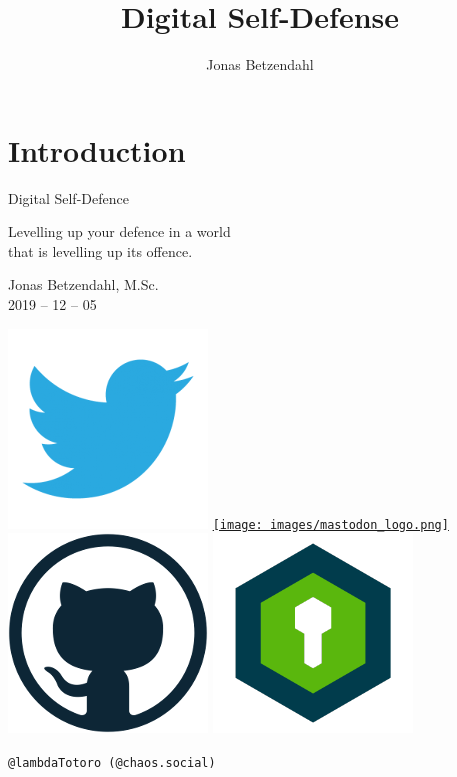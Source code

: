 \documentclass[aspectratio=169,x11names]{beamer}
\author{Jonas Betzendahl}
\title{Digital Self-Defense}
\begin{document}
\section{Introduction}

\begin{frame}
\begin{center}
\vfill
\huge Digital Self-Defence
\normalsize 
\smallskip
\smallskip

Levelling up your defence in a world\\ that is levelling up its offence.
\bigskip\bigskip

\large Jonas Betzendahl, M.Sc.\\
2019 -- 12 -- 05
\bigskip\bigskip

\href{https://twitter.com/lambdatotoro}{\includegraphics[scale=0.125]{images/twitter_logo.png}}
\href{https://chaos.social/@lambdatotoro}{\texttt{[image: images/mastodon\_logo.png]}}
\href{https://github.com/lambdaTotoro}{\includegraphics[scale=0.125]{images/github_logo.png}}
\href{https://whispeer.de/en/user/jbetzend}{\includegraphics[scale=0.125]{images/whispeer_logo.png}}

\texttt{@lambdaTotoro (@chaos.social)}
\end{center}
\end{frame}
\end{document}
